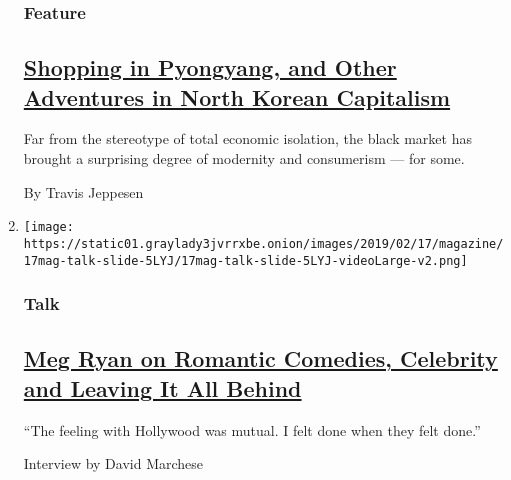\begin{enumerate}
  \hypertarget{feature-2}{%
  \subsubsection{Feature}\label{feature-2}}

  \hypertarget{shopping-in-pyongyang-and-other-adventures-in-north-korean-capitalism}{%
  \subsection{\texorpdfstring{\href{/2019/02/14/magazine/north-korea-black-market-economy.html}{Shopping
  in Pyongyang, and Other Adventures in North Korean
  Capitalism}}{Shopping in Pyongyang, and Other Adventures in North Korean Capitalism}}\label{shopping-in-pyongyang-and-other-adventures-in-north-korean-capitalism}}

  Far from the stereotype of total economic isolation, the black market
  has brought a surprising degree of modernity and consumerism --- for
  some.

  By Travis Jeppesen
\item
  \texttt{[image: https://static01.graylady3jvrrxbe.onion/images/2019/02/17/magazine/17mag-talk-slide-5LYJ/17mag-talk-slide-5LYJ-videoLarge-v2.png]}

  \hypertarget{talk}{%
  \subsubsection{Talk}\label{talk}}

  \hypertarget{meg-ryan-on-romantic-comedies-celebrity-and-leaving-it-all-behind}{%
  \subsection{\texorpdfstring{\href{/interactive/2019/02/15/magazine/meg-ryan-romantic-comedy.html}{Meg
  Ryan on Romantic Comedies, Celebrity and Leaving It All
  Behind}}{Meg Ryan on Romantic Comedies, Celebrity and Leaving It All Behind}}\label{meg-ryan-on-romantic-comedies-celebrity-and-leaving-it-all-behind}}

  ``The feeling with Hollywood was mutual. I felt done when they felt
  done.''

  Interview by David Marchese
\end{enumerate}


